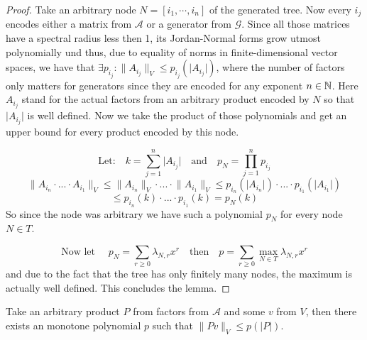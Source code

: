 \begin{proof}
  Take an arbitrary node $N = [i_1, \cdots, i_n]$ of the generated tree. 
  Now every $i_j$ encodes either a matrix from $\mathcal{A}$ or a generator from $\mathcal{G}$. 
  Since all those matrices have a spectral radius less then 1, its Jordan-Normal forms grow utmost polynomially und thus, due to equality of norms in finite-dimensional vector spaces, we have that $ \exists p_{i_j}: \lVert A_{i_j} \rVert _V \le p_{i_j}(\lvert A_{i_j} \rvert)$, where the number of factors only matters for generators since they are encoded for any exponent $n \in \mathbb{N}$.
  Here $ A_{i_j} $ stand for the actual factors from an arbitrary product encoded by $N$ so that $\lvert A_{i_j} \rvert$ is well defined. 
  Now we take the product of those polynomials and get an upper bound for every product encoded by this node. 

  $$ 
    \text{Let:} \quad k = \sum \limits_{j = 1}^{n} \lvert A_{i_j} \rvert \quad \text{and} \quad p_{N} = \prod \limits_{j = 1}^{n} p_{i_j}
  $$
  $$ 
    \lVert A_{i_n} \cdot ... \cdot A_{i_1} \rVert _V \le \lVert A_{i_n} \rVert _V \cdot ... \cdot \lVert A_{i_1} \rVert _V \le p_{i_n}(\lvert A_{i_n} \rvert) \cdot ... \cdot p_{i_1}(\lvert A_{i_1} \rvert)
  $$
  $$
    \le p_{i_n}(k) \cdot ... \cdot p_{i_1}(k) = p_{N}(k)
  $$
  So since the node was arbitrary we have such a polynomial $p_N$ for every node $N \in T$. 
  
  $$
    \text{Now let } \quad p_N = \sum \limits_{r \geq 0} \lambda_{N,r} x^r \quad \text{then} \quad p = \sum \limits_{r \geq 0} \max \limits_{N \in T}\lambda_{N,r}x^r
  $$
  and due to the fact that the tree has only finitely many nodes, the maximum is actually well defined. This concludes the lemma.
  
\end{proof}

\begin{lemma}
  \label{lem:arb.prod.bound}
  Take an arbitrary product $P$ from factors from $\mathcal{A}$ and some $v$ from $V$, then there exists an monotone polynomial $p$ such that $\lVert Pv \rVert _V \le p(\lvert P \rvert)$.
\end{lemma}

